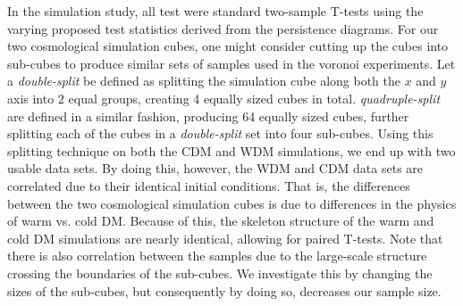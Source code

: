 \documentclass[12pt]{article}
\begin{document}
In the simulation study, all test were standard two-sample T-tests  using the varying proposed test statistics derived from the persistence diagrams.  For our two cosmological simulation cubes, one might consider cutting up the cubes into sub-cubes to produce similar sets of samples used in the voronoi experiments. Let a \textit{double-split} be defined as splitting the simulation cube along both the $x$ and $y$ axis into $2$ equal groups, creating 4 equally sized cubes in total. \textit{quadruple-split} are defined in a similar fashion, producing 64 equally sized cubes, further splitting each of the cubes in a \textit{double-split} set into four sub-cubes. Using this splitting technique on both the CDM and WDM simulations, we end up with two usable data sets. By doing this, however, the WDM and CDM data sets are correlated due to their identical initial conditions.  That is, the differences between the two cosmological simulation cubes is due to differences in the physics of warm vs. cold DM.  Because of this, the skeleton structure of the warm and cold DM simulations are nearly identical, allowing for paired T-tests.  Note that there is also correlation between the samples due to the large-scale structure crossing the boundaries of the sub-cubes.  We investigate this by changing the sizes of the sub-cubes, but consequently by doing so, decreases our sample size.
\end{document}
